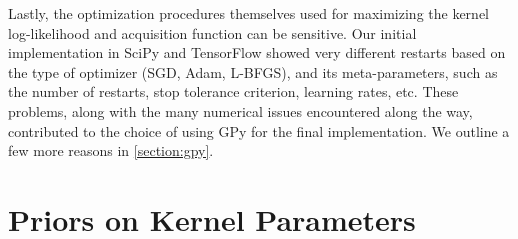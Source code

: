 Lastly, the optimization procedures themselves used for maximizing the kernel log-likelihood and acquisition function can be sensitive. Our initial implementation in SciPy and TensorFlow showed very different restarts based on the type of optimizer (SGD, Adam, L-BFGS), and its meta-parameters, such as the number of restarts, stop tolerance criterion, learning rates, etc. These problems, along with the many numerical issues encountered along the way, contributed to the choice of using GPy for the final implementation. We outline a few more reasons in \autoref{section:gpy}.


\section{Priors on Kernel Parameters}
\label{section:priors-on-kernel-params}
